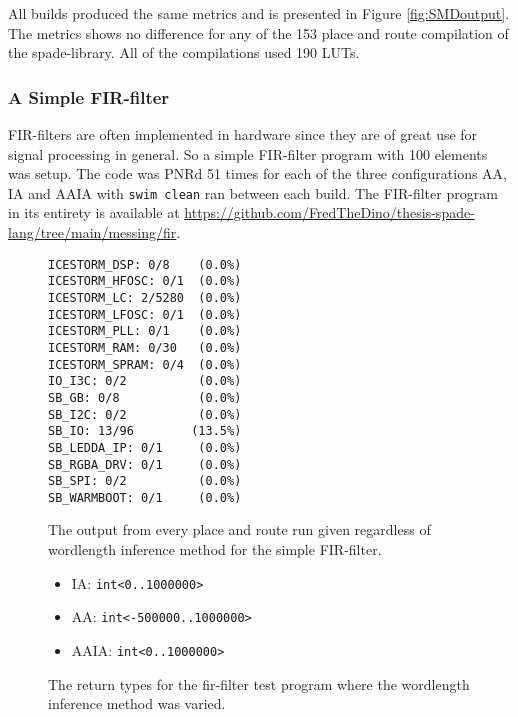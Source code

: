All builds produced the same metrics and is presented in Figure \ref{fig:SMDoutput}. The metrics shows no difference for any of the 153 place and route compilation of the spade-library. All of the compilations used 190 LUTs. 

\subsubsection{A Simple FIR-filter}
FIR-filters are often implemented in hardware since they are of great use for signal processing in general. So a simple FIR-filter program with 100 elements was setup. The code was PNRd 51 times for each of the three configurations AA, IA and AAIA with \verb+swim clean+ ran between each build. The FIR-filter program in its entirety is available at \href{https://github.com/FredTheDino/thesis-spade-lang/tree/main/messing/fir}{https://github.com/FredTheDino/thesis-spade-lang/tree/main/messing/fir}.

\begin{figure}
\begin{center}
\begin{verbatim}
ICESTORM_DSP: 0/8    (0.0%)
ICESTORM_HFOSC: 0/1  (0.0%)
ICESTORM_LC: 2/5280  (0.0%)
ICESTORM_LFOSC: 0/1  (0.0%)
ICESTORM_PLL: 0/1    (0.0%)
ICESTORM_RAM: 0/30   (0.0%)
ICESTORM_SPRAM: 0/4  (0.0%)
IO_I3C: 0/2          (0.0%)
SB_GB: 0/8           (0.0%)
SB_I2C: 0/2          (0.0%)
SB_IO: 13/96        (13.5%)
SB_LEDDA_IP: 0/1     (0.0%)
SB_RGBA_DRV: 0/1     (0.0%)
SB_SPI: 0/2          (0.0%)
SB_WARMBOOT: 0/1     (0.0%)
\end{verbatim}
\end{center}

  \caption{The output from every place and route run given regardless of wordlength inference method for the simple FIR-filter.}
  \label{fig:FIRoutput}
\end{figure}

\begin{figure}
\begin{itemize}
  \item IA: \verb+int<0..1000000>+
  \item AA: \verb+int<-500000..1000000>+
  \item AAIA: \verb+int<0..1000000>+
\end{itemize}
  \caption{The return types for the fir-filter test program where the wordlength inference method was varied.}
  \label{figRangeRes}
\end{figure}

